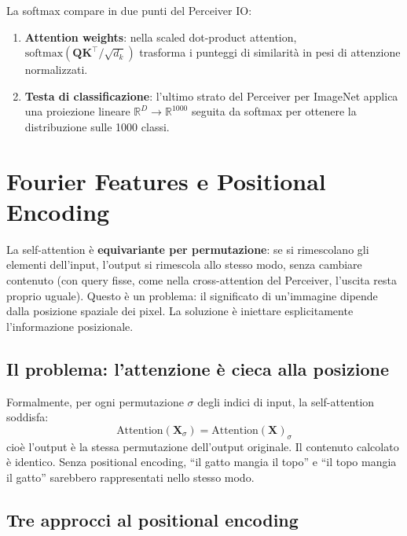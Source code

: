 \documentclass[
  11pt,
]{article}
\begin{document}
\begin{notabox}[title={\textbf{Softmax nel Perceiver}}]
La softmax compare in due punti del Perceiver IO:
\begin{enumerate}
  \item \textbf{Attention weights}: nella scaled dot-product attention, $\text{softmax}(\mathbf{Q}\mathbf{K}^\top/\sqrt{d_k})$ trasforma i punteggi di similarità in pesi di attenzione normalizzati.
  \item \textbf{Testa di classificazione}: l'ultimo strato del Perceiver per ImageNet applica una proiezione lineare $\mathbb{R}^D \to \mathbb{R}^{1000}$ seguita da softmax per ottenere la distribuzione sulle 1000 classi.
\end{enumerate}
\end{notabox}

\section{Fourier Features e Positional Encoding}
\label{app:fourier-theory}

La self-attention è \textbf{equivariante per permutazione}: se si rimescolano gli elementi dell'input, l'output si rimescola allo stesso modo, senza cambiare contenuto (con query fisse, come nella cross-attention del Perceiver, l'uscita resta proprio uguale). Questo è un problema: il significato di un'immagine dipende dalla posizione spaziale dei pixel. La soluzione è iniettare esplicitamente l'informazione posizionale.

\subsection{Il problema: l'attenzione è cieca alla posizione}

Formalmente, per ogni permutazione $\sigma$ degli indici di input, la self-attention soddisfa:
\[
\text{Attention}(\mathbf{X}_{\sigma}) = \text{Attention}(\mathbf{X})_{\sigma}
\]
cioè l'output è la stessa permutazione dell'output originale. Il contenuto calcolato è identico. Senza positional encoding, ``il gatto mangia il topo'' e ``il topo mangia il gatto'' sarebbero rappresentati nello stesso modo.

\subsection{Tre approcci al positional encoding}
\end{document}
